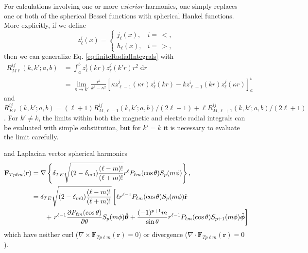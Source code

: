 \documentclass{article}
\begin{document}
For calculations involving one or more \textit{exterior} harmonics, one simply replaces one or both of the spherical Bessel functions with spherical Hankel functions. More explicitly, if we define 
\begin{equation}
z_\ell^i(x) = 
\begin{cases}
j_\ell(x), & i = \,<,\\
h_\ell(x), & i = \,>,
\end{cases}
\end{equation}
then we can generalize Eq. \eqref{eq:finiteRadialIntegrals} with
\begin{equation}
\begin{split}
R_{M\ell}^{ij}(k,k';a,b) &= \int_a^bz_\ell^i(kr)z_\ell^j(k'r)r^2\;\mathrm{d}r\\
&= \lim_{\kappa\to k'}\frac{r^2}{k^2 - \kappa^2}\left[\kappa z_{\ell-1}^j(\kappa r)z_{\ell}^i(kr) - kz_{\ell-1}^i(kr)z_{\ell}^j(\kappa r)\right]_a^b
\end{split}
\end{equation}
and $R_{E\ell}^{ij}(k,k';a,b) = (\ell+1)R_{M,\ell - 1}^{ij}(k,k';a,b)/(2\ell + 1) + \ell R_{M,\ell + 1}^{ij}(k,k';a,b)/(2\ell + 1)$. For $k'\neq k$, the limits within both the magnetic and electric radial integrals can be evaluated with simple substitution, but for $k'=k$ it is necessary to evaluate the limit carefully.




and Laplacian vector spherical harmonics
\begin{equation}
\begin{split}
\mathbf{F}_{Tp\ell m}(\mathbf{r}) &= \nabla\left\{\delta_{TE}\sqrt{(2 - \delta_{m0})\frac{(\ell - m)!}{(\ell + m)!}}r^\ell P_{\ell m}(\cos\theta)S_p(m\phi)\right\},\\
&= \delta_{TE}\sqrt{(2 - \delta_{m0})\frac{(\ell - m)!}{(\ell + m)!}}\left[ \vphantom{\frac{(-1)^{p+1}}{\sin\theta}} \ell r^{\ell - 1}P_{\ell m}(\cos\theta)S_p(m\phi)\hat{\mathbf{r}}\right.\\
&\qquad+ \left. r^{\ell - 1}\frac{\partial P_{\ell m}(\cos\theta)}{\partial \theta}S_p(m\phi)\hat{\bm{\theta}} + \frac{(-1)^{p+1}m}{\sin\theta}r^{\ell - 1}P_{\ell m}(\cos\theta)S_{p+1}(m\phi)\hat{\bm{\phi}} \right]
\end{split}
\end{equation}
which have neither curl ($\nabla\times\mathbf{F}_{Tp\ell m}(\mathbf{r}) = 0$) or divergence ($\nabla\cdot\mathbf{F}_{Tp\ell m}(\mathbf{r}) = 0$). 
\end{document}

